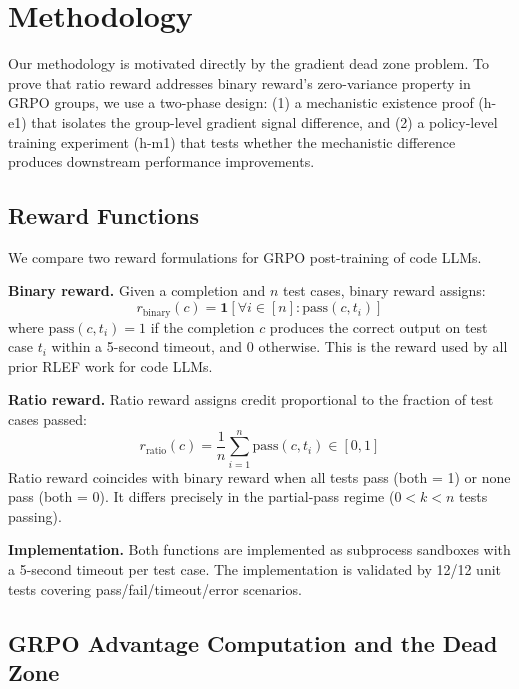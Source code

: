 \section{Methodology}
\label{sec:methodology}

Our methodology is motivated directly by the gradient dead zone problem. To prove that ratio reward addresses binary reward's zero-variance property in GRPO groups, we use a two-phase design: (1) a mechanistic existence proof (h-e1) that isolates the group-level gradient signal difference, and (2) a policy-level training experiment (h-m1) that tests whether the mechanistic difference produces downstream performance improvements.

\subsection{Reward Functions}

We compare two reward formulations for GRPO post-training of code LLMs.

\textbf{Binary reward.} Given a completion and $n$ test cases, binary reward assigns:
\begin{equation}
r_{\text{binary}}(c) = \mathbf{1}[\forall i \in [n]: \text{pass}(c, t_i)]
\end{equation}
where $\text{pass}(c, t_i) = 1$ if the completion $c$ produces the correct output on test case $t_i$ within a 5-second timeout, and 0 otherwise. This is the reward used by all prior RLEF work for code LLMs.

\textbf{Ratio reward.} Ratio reward assigns credit proportional to the fraction of test cases passed:
\begin{equation}
r_{\text{ratio}}(c) = \frac{1}{n} \sum_{i=1}^{n} \text{pass}(c, t_i) \in [0, 1]
\end{equation}
Ratio reward coincides with binary reward when all tests pass (both = 1) or none pass (both = 0). It differs precisely in the partial-pass regime ($0 < k < n$ tests passing).

\textbf{Implementation.} Both functions are implemented as subprocess sandboxes with a 5-second timeout per test case. The implementation is validated by 12/12 unit tests covering pass/fail/timeout/error scenarios.

\subsection{GRPO Advantage Computation and the Dead Zone}

